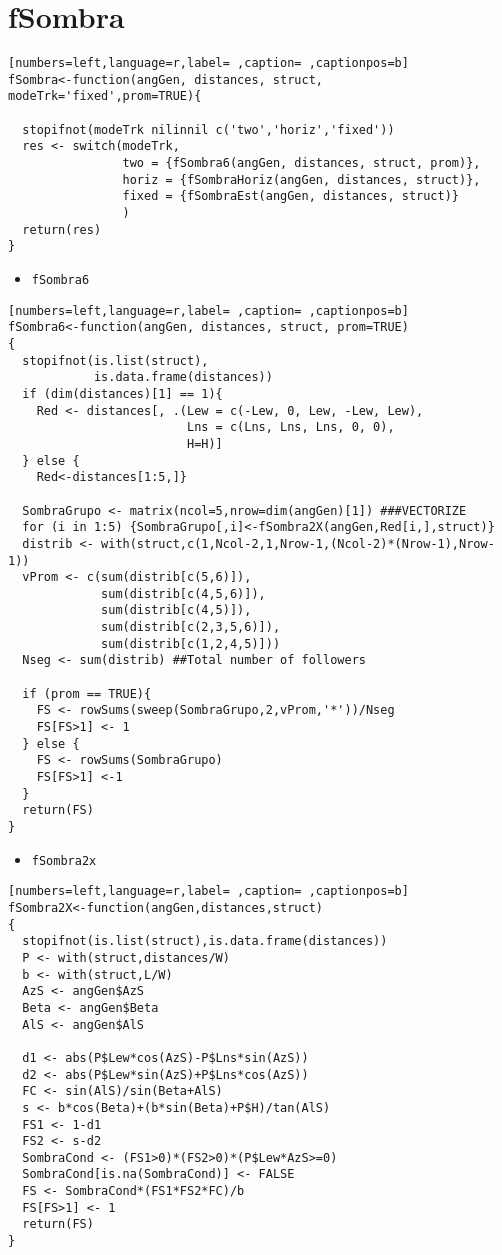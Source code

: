 \section{fSombra}
\label{sec:org040f74a}
\begin{lstlisting}[numbers=left,language=r,label= ,caption= ,captionpos=b]
fSombra<-function(angGen, distances, struct, modeTrk='fixed',prom=TRUE){

  stopifnot(modeTrk nilinnil c('two','horiz','fixed'))
  res <- switch(modeTrk, 
                two = {fSombra6(angGen, distances, struct, prom)},
                horiz = {fSombraHoriz(angGen, distances, struct)},
                fixed = {fSombraEst(angGen, distances, struct)}
                )
  return(res)
}
\end{lstlisting}
\begin{itemize}
\item \texttt{fSombra6}
\end{itemize}
\begin{lstlisting}[numbers=left,language=r,label= ,caption= ,captionpos=b]
fSombra6<-function(angGen, distances, struct, prom=TRUE)
{
  stopifnot(is.list(struct),
            is.data.frame(distances))
  if (dim(distances)[1] == 1){ 
    Red <- distances[, .(Lew = c(-Lew, 0, Lew, -Lew, Lew),
                         Lns = c(Lns, Lns, Lns, 0, 0),
                         H=H)]
  } else { 
    Red<-distances[1:5,]} 

  SombraGrupo <- matrix(ncol=5,nrow=dim(angGen)[1]) ###VECTORIZE
  for (i in 1:5) {SombraGrupo[,i]<-fSombra2X(angGen,Red[i,],struct)}
  distrib <- with(struct,c(1,Ncol-2,1,Nrow-1,(Ncol-2)*(Nrow-1),Nrow-1)) 
  vProm <- c(sum(distrib[c(5,6)]),
             sum(distrib[c(4,5,6)]),
             sum(distrib[c(4,5)]),
             sum(distrib[c(2,3,5,6)]),
             sum(distrib[c(1,2,4,5)]))
  Nseg <- sum(distrib) ##Total number of followers

  if (prom == TRUE){
    FS <- rowSums(sweep(SombraGrupo,2,vProm,'*'))/Nseg
    FS[FS>1] <- 1
  } else {		
    FS <- rowSums(SombraGrupo)
    FS[FS>1] <-1
  }
  return(FS)
}
\end{lstlisting}
\begin{itemize}
\item \texttt{fSombra2x}
\end{itemize}
\begin{lstlisting}[numbers=left,language=r,label= ,caption= ,captionpos=b]
fSombra2X<-function(angGen,distances,struct)
{
  stopifnot(is.list(struct),is.data.frame(distances))
  P <- with(struct,distances/W)
  b <- with(struct,L/W)
  AzS <- angGen$AzS
  Beta <- angGen$Beta
  AlS <- angGen$AlS

  d1 <- abs(P$Lew*cos(AzS)-P$Lns*sin(AzS))
  d2 <- abs(P$Lew*sin(AzS)+P$Lns*cos(AzS))
  FC <- sin(AlS)/sin(Beta+AlS)
  s <- b*cos(Beta)+(b*sin(Beta)+P$H)/tan(AlS)
  FS1 <- 1-d1
  FS2 <- s-d2
  SombraCond <- (FS1>0)*(FS2>0)*(P$Lew*AzS>=0)
  SombraCond[is.na(SombraCond)] <- FALSE 
  FS <- SombraCond*(FS1*FS2*FC)/b
  FS[FS>1] <- 1
  return(FS)
}
\end{lstlisting}
